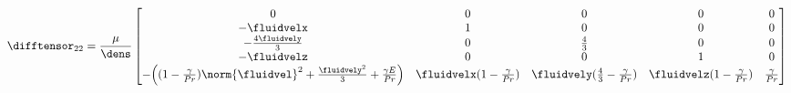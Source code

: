 \documentclass[../main.tex]{subfiles}
\begin{document}
\def\kto{ -\fluidvelx }
\def\keo{ -\frac{4\fluidvely}{3} }
\def\kao{ -\fluidvelz }
\def\kso{ -\Big((1-\frac{\gamma}{Pr})\norm{\fluidvel}^2+\frac{\fluidvely^2}{3}+\frac{\gamma E}{Pr} \Big)  }
\def\ktt{ 1 }
\def\kst{ \fluidvelx(1-\frac{\gamma}{Pr}) }
\def\kee{ \frac{4}{3} }
\def\kse{ \fluidvely(\frac{4}{3}-\frac{\gamma}{Pr}) }
\def\kaa{ 1 }
\def\ksa{ \fluidvelz(1-\frac{\gamma}{Pr}) }
\def\kss{ \frac{\gamma}{Pr} }
\begin{align}\nonumber
\difftensor_{22}=\frac{\mu}{\dens}
\begin{bmatrix}
  0     &    0     &    0     &    0     &    0     \\ %
  \kto  &    \ktt  &    0     &    0     &    0     \\ %
  \keo  &    0     &    \kee  &    0     &    0     \\ %
  \kao  &    0     &    0     &    \kaa  &    0     \\ %
  \kso  &    \kst  &    \kse  &    \ksa  &    \kss  \\ %
\end{bmatrix}
\end{align}
\end{document}
